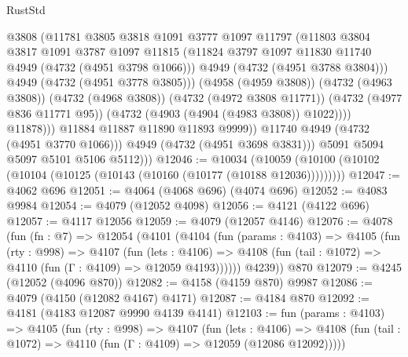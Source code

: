 \begin{lexlean}{RustStd}
\begin{coremodule}
                            @3808
                            (@11781
                              @3805
                              @3818
                              @1091
                              @3777
                              @1097
                              @11797
                              (@11803
                                @3804
                                @3817
                                @1091
                                @3787
                                @1097
                                @11815
                                (@11824 @3797 @1097 @11830 @11740 @4949 (@4732 (@4951 @3798 @1066)))
                                @4949
                                (@4732 (@4951 @3788 @3804)))
                              @4949
                              (@4732 (@4951 @3778 @3805)))
                            (@4958 (@4959 @3808))
                            (@4732 (@4963 @3808))
                            (@4732 (@4968 @3808))
                            (@4732 (@4972 @3808 @11771))
                            (@4732 (@4977 @836 @11771 @95))
                            (@4732 (@4903 (@4904 (@4983 @3808)) @1022))))
                        @11878)))
                  @11884
                  @11887
                  @11890
                  @11893
                  @9999))
              @11740
              @4949
              (@4732 (@4951 @3770 @1066)))
            @4949
            (@4732 (@4951 @3698 @3831)))
          @5091
          @5094
          @5097
          @5101
          @5106
          @5112)))
@12046 := @10034
    (@10059 (@10100 (@10102 (@10104 (@10125 (@10143 (@10160 (@10177 (@10188 @12036)))))))))
@12047 := @4062 @696
@12051 := @4064 (@4068 @696) (@4074 @696)
@12052 := @4083 @9984
@12054 := @4079 (@12052 @4098)
@12056 := @4121 (@4122 @696)
@12057 := @4117 @12056
@12059 := @4079 (@12057 @4146)
@12076 := @4078
    (fun (fn : @7) =>
    @12054
      (@4101
        (@4104
          (fun (params : @4103) =>
          @4105
            (fun (rty : @998) =>
            @4107
              (fun (lets : @4106) =>
              @4108 (fun (tail : @1072) => @4110 (fun (Γ : @4109) => @12059 @4193))))))
        @4239))
    @870
@12079 := @4245 (@12052 (@4096 @870))
@12082 := @4158 (@4159 @870) @9987
@12086 := @4079 (@4150 (@12082 @4167) @4171)
@12087 := @4184 @870
@12092 := @4181 (@4183 @12087 @9990 @4139 @4141)
@12103 := fun (params : @4103) =>
  @4105
    (fun (rty : @998) =>
    @4107
      (fun (lets : @4106) =>
      @4108 (fun (tail : @1072) => @4110 (fun (Γ : @4109) => @12059 (@12086 @12092)))))

\end{coremodule}
\end{lexlean}
